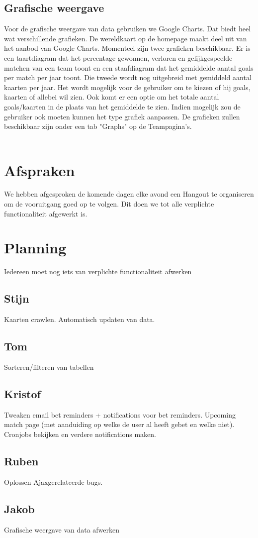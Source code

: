 \documentclass[11pt, a4paper]{article}
\begin{document}
\subsection{Grafische weergave}
Voor de grafische weergave van data gebruiken we Google Charts. Dat biedt heel wat verschillende grafieken. De wereldkaart op de homepage maakt deel uit van het aanbod van Google Charts. Momenteel zijn twee grafieken beschikbaar. Er is een taartdiagram dat het percentage gewonnen, verloren en gelijkgespeelde matchen van een team toont en een staafdiagram dat het gemiddelde aantal goals per match per jaar toont. Die tweede wordt nog uitgebreid met gemiddeld aantal kaarten per jaar. Het wordt mogelijk voor de gebruiker om te kiezen of hij goals, kaarten of allebei wil zien. Ook komt er een optie om het totale aantal goals/kaarten in de plaats van het gemiddelde te zien. Indien mogelijk zou de gebruiker ook moeten kunnen het type grafiek aanpassen. De grafieken zullen beschikbaar zijn onder een tab "Graphs" op de Teampagina's.
\\
\\
\section{Afspraken}
We hebben afgesproken de komende dagen elke avond een Hangout te organiseren om de vooruitgang goed op te volgen. Dit doen we tot alle verplichte functionaliteit afgewerkt is.


\section{Planning}
Iedereen moet nog iets van verplichte functionaliteit afwerken
\subsection{Stijn}
Kaarten crawlen. Automatisch updaten van data.
\subsection{Tom}
Sorteren/filteren van tabellen
\subsection{Kristof}
Tweaken email bet reminders + notifications voor bet reminders. Upcoming match page (met aanduiding op welke de user al heeft gebet en welke niet).
Cronjobs bekijken en verdere notifications maken.
\subsection{Ruben}
Oplossen Ajaxgerelateerde bugs.
\subsection{Jakob}
Grafische weergave van data afwerken
\end{document}
